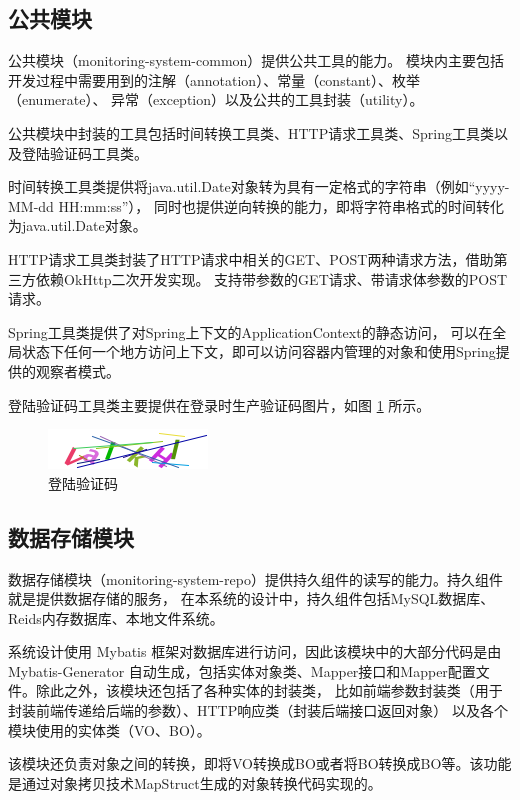 \newpage
\subsection{公共模块}
公共模块（monitoring-system-common）提供公共工具的能力。
模块内主要包括开发过程中需要用到的注解（annotation）、常量（constant）、枚举（enumerate）、
异常（exception）以及公共的工具封装（utility）。

公共模块中封装的工具包括时间转换工具类、HTTP请求工具类、Spring工具类以及登陆验证码工具类。

时间转换工具类提供将java.util.Date对象转为具有一定格式的字符串（例如“yyyy-MM-dd HH:mm:ss”），
同时也提供逆向转换的能力，即将字符串格式的时间转化为java.util.Date对象。

HTTP请求工具类封装了HTTP请求中相关的GET、POST两种请求方法，借助第三方依赖OkHttp二次开发实现。
支持带参数的GET请求、带请求体参数的POST请求。

Spring工具类提供了对Spring上下文的ApplicationContext的静态访问，
可以在全局状态下任何一个地方访问上下文，即可以访问容器内管理的对象和使用Spring提供的观察者模式。

登陆验证码工具类主要提供在登录时生产验证码图片，如图 \ref{Fig:code} 所示。

\begin{figure}[ht]
    \centering
    \includegraphics[width=0.5\linewidth]{./Figure/IMG_code.png}
    \caption{登陆验证码}\label{Fig:code}
\end{figure}

\subsection{数据存储模块}
数据存储模块（monitoring-system-repo）提供持久组件的读写的能力。持久组件就是提供数据存储的服务，
在本系统的设计中，持久组件包括MySQL数据库、Reids内存数据库、本地文件系统。

系统设计使用 Mybatis 框架对数据库进行访问，因此该模块中的大部分代码是由 Mybatis-Generator\cite{MyBatis}
自动生成，包括实体对象类、Mapper接口和Mapper配置文件。除此之外，该模块还包括了各种实体的封装类，
比如前端参数封装类（用于封装前端传递给后端的参数）、HTTP响应类（封装后端接口返回对象）
以及各个模块使用的实体类（VO、BO）。

该模块还负责对象之间的转换，即将VO转换成BO或者将BO转换成BO等。该功能是通过对象拷贝技术MapStruct生成的对象转换代码实现的。

